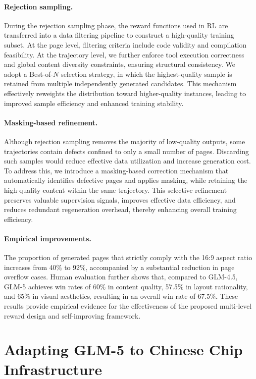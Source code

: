 \documentclass{article}
\theoremstyle{definition}
\begin{document}
\paragraph{Rejection sampling.}
During the rejection sampling phase, the reward functions used in RL are transferred into a data filtering pipeline to construct a high-quality training subset.
At the page level, filtering criteria include code validity and compilation feasibility. At the trajectory level, we further enforce tool execution correctness and global content diversity constraints, ensuring structural consistency.
We adopt a Best-of-$N$ selection strategy, in which the highest-quality sample is retained from multiple independently generated candidates. This mechanism effectively reweights the distribution toward higher-quality instances, leading to improved sample efficiency and enhanced training stability.

\paragraph{Masking-based refinement.} 
Although rejection sampling removes the majority of low-quality outputs, some trajectories contain defects confined to only a small number of pages. Discarding such samples would reduce effective data utilization and increase generation cost. To address this, we introduce a masking-based correction mechanism that automatically identifies defective pages and applies masking, while retaining the high-quality content within the same trajectory. This selective refinement preserves valuable supervision signals, improves effective data efficiency, and reduces redundant regeneration overhead, thereby enhancing overall training efficiency.

\paragraph{Empirical improvements.}
The proportion of generated pages that strictly comply with the 16:9 aspect ratio increases from 40\% to 92\%, accompanied by a substantial reduction in page overflow cases. Human evaluation further shows that, compared to GLM-4.5, GLM-5 achieves win rates of 60\% in content quality, 57.5\% in layout rationality, and 65\% in visual aesthetics, resulting in an overall win rate of 67.5\%. These results provide empirical evidence for the effectiveness of the proposed multi-level reward design and self-improving framework.

\section{Adapting GLM-5 to Chinese Chip Infrastructure}
\label{sec:chinese}
\end{document}
